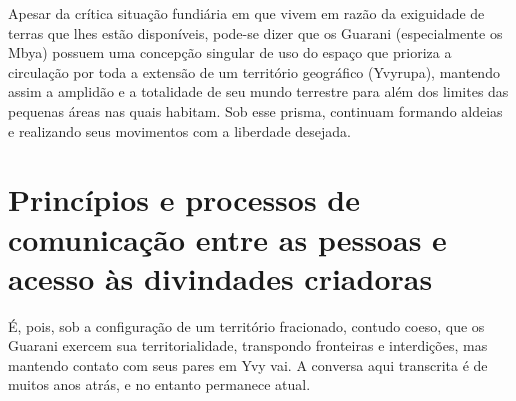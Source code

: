 {{Apesar da crítica situação fundiária em que vivem em razão da exiguidade
de terras que lhes estão disponíveis, pode-se dizer que os Guarani
(especialmente os Mbya) possuem uma concepção singular de uso do espaço
que prioriza a circulação por toda a extensão de um território
geográfico (Yvyrupa), mantendo assim a amplidão e a totalidade de seu
mundo terrestre para além dos limites das pequenas áreas nas quais
habitam. Sob esse prisma, continuam formando aldeias e realizando seus
movimentos com a liberdade desejada.  

\section{Princípios e processos de comunicação entre as pessoas e acesso às
divindades criadoras} 

É, pois, sob a configuração de um território fracionado, contudo coeso,
que os Guarani exercem sua territorialidade, transpondo fronteiras e
interdições, mas mantendo contato com seus pares em Yvy vai. A conversa
aqui transcrita é de muitos anos atrás, e no entanto permanece atual. 

}}
